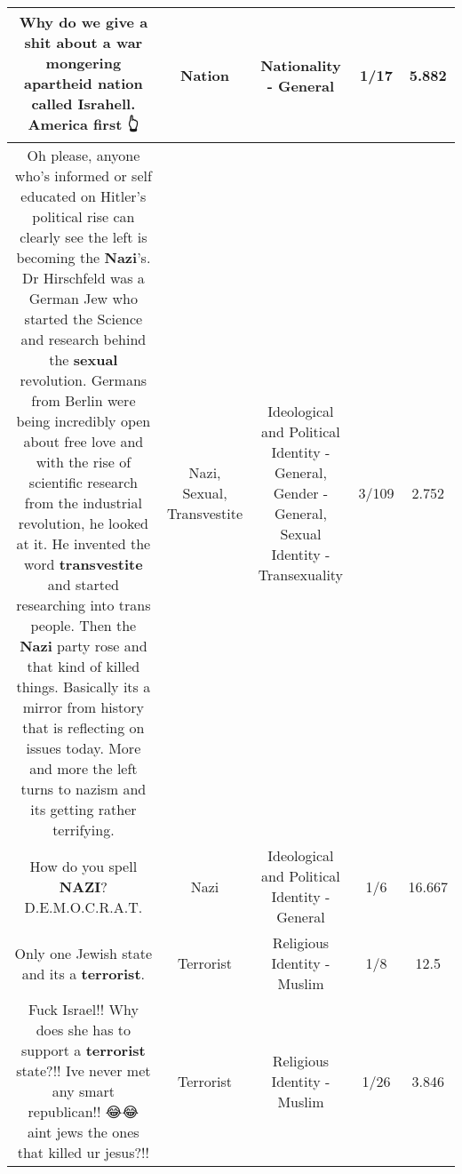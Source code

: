 \documentclass[11pt]{article}
\newlength\mylength
\begin{document}
\begin{center}
\begin{longtable}{|C{.65\mylength}|C{.30\mylength}|C{.12\mylength}|C{.12\mylength}|C{.12\mylength}|}
  \small Why do we give a shit about a war mongering apartheid \textbf{nation} called Israhell. America first 👆\normalsize   & Nation & Nationality - General & 1/17 & 5.882 \\  \hline
  \small Oh please, anyone who's informed or self educated on Hitler's political rise can clearly see the left is becoming the \textbf{Nazi}'s.  Dr Hirschfeld was a German Jew who started the Science and research behind the \textbf{sexual} revolution.  Germans from Berlin were being incredibly open about free love and with the rise of scientific research from the industrial revolution, he looked at it.  He invented the word \textbf{transvestite} and started researching into trans people.  Then the \textbf{Nazi} party rose and that kind of killed things.  Basically its a mirror from history that is reflecting on issues today.  More and more the left turns to nazism and its getting rather terrifying.\normalsize   & Nazi, Sexual, Transvestite &  Ideological and Political Identity - General, Gender - General, Sexual Identity - Transexuality & 3/109 & 2.752 \\  \hline
  \small How do you spell \textbf{NAZI}? D.E.M.O.C.R.A.T.\normalsize   & Nazi &  Ideological and Political Identity - General & 1/6 & 16.667 \\  \hline
  \small Only one Jewish state and its a \textbf{terrorist}.\normalsize   & Terrorist & Religious Identity - Muslim & 1/8 & 12.5 \\  \hline
  \small Fuck Israel!! Why does she has to support a \textbf{terrorist} state?!!  Ive never met any smart republican!! 😂😂 aint jews the ones that killed ur jesus?!!\normalsize   & Terrorist & Religious Identity - Muslim & 1/26 & 3.846 \\  \hline

\end{longtable}
\end{center}
\end{document}
